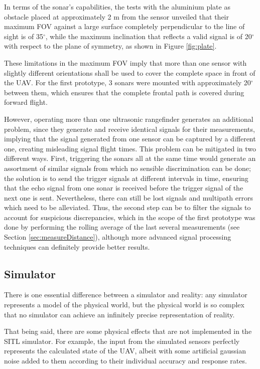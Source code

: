 In terms of the sonar's capabilities, the tests with the aluminium plate as obstacle placed at approximately 2 m from the sensor unveiled that their maximum FOV against a large surface completely perpendicular to the line of sight is of 35$^\circ$, while the maximum inclination that reflects a valid signal is of 20$^\circ$ with respect to the plane of symmetry, as shown in Figure \ref{fig:plate}.



These limitations in the maximum FOV imply that more than one sensor with slightly different orientations shall be used to cover the complete space in front of the UAV.
For the first prototype, 3 sonars were mounted with approximately 20$^\circ$ between them, which ensures that the complete frontal path is covered during forward flight.

However, operating more than one ultrasonic rangefinder generates an additional problem, since they generate and receive identical signals for their measurements, implying that the signal generated from one sensor can be captured by a different one, creating misleading signal flight times.
This problem can be mitigated in two different ways.
First, triggering the sonars all at the same time would generate an assortment of similar signals from which no sensible discrimination can be done; the solution is to send the trigger signals at different intervals in time, ensuring that the echo signal from one sonar is received before the trigger signal of the next one is sent.
Nevertheless, there can still be lost signals and multipath errors which need to be alleviated.
Thus, the second step can be to filter the signals to account for suspicious discrepancies, which in the scope of the first prototype was done by performing the rolling average of the last several measurements (see Section \ref{sec:measureDistance}), although more advanced signal processing techniques can definitely provide better results.


\subsection{Simulator} \label{sec:sitl}

There is one essential difference between a simulator and reality: any simulator represents a model of the physical world, but the physical world is so complex that no simulator can achieve an infinitely precise representation of reality.

That being said, there are some physical effects that are not implemented in the SITL simulator. For example, the input from the simulated sensors perfectly represents the calculated state of the UAV, albeit with some artificial gaussian noise added to them according to their individual accuracy and response rates.

